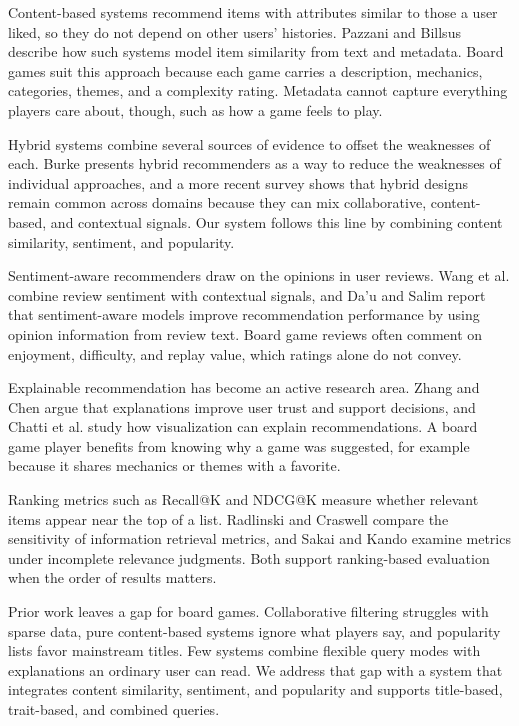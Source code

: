 \documentclass[conference]{IEEEtran}
\begin{document}
Content-based systems recommend items with attributes similar to those a user liked, so they do not depend on other users' histories. Pazzani and Billsus \cite{pazzani2007content} describe how such systems model item similarity from text and metadata. Board games suit this approach because each game carries a description, mechanics, categories, themes, and a complexity rating. Metadata cannot capture everything players care about, though, such as how a game feels to play.

Hybrid systems combine several sources of evidence to offset the weaknesses of each. Burke \cite{burke2002hybrid} presents hybrid recommenders as a way to reduce the weaknesses of individual approaches, and a more recent survey \cite{ko2022survey} shows that hybrid designs remain common across domains because they can mix collaborative, content-based, and contextual signals. Our system follows this line by combining content similarity, sentiment, and popularity.

Sentiment-aware recommenders draw on the opinions in user reviews. Wang et al. \cite{wang2017location} combine review sentiment with contextual signals, and Da'u and Salim \cite{da2019sentiment} report that sentiment-aware models improve recommendation performance by using opinion information from review text. Board game reviews often comment on enjoyment, difficulty, and replay value, which ratings alone do not convey.

Explainable recommendation has become an active research area. Zhang and Chen \cite{zhang2020explainable} argue that explanations improve user trust and support decisions, and Chatti et al. \cite{chatti2024visualization} study how visualization can explain recommendations. A board game player benefits from knowing why a game was suggested, for example because it shares mechanics or themes with a favorite.

Ranking metrics such as Recall@K and NDCG@K measure whether relevant items appear near the top of a list. Radlinski and Craswell \cite{radlinski2010comparing} compare the sensitivity of information retrieval metrics, and Sakai and Kando \cite{sakai2008information} examine metrics under incomplete relevance judgments. Both support ranking-based evaluation when the order of results matters.

Prior work leaves a gap for board games. Collaborative filtering struggles with sparse data, pure content-based systems ignore what players say, and popularity lists favor mainstream titles. Few systems combine flexible query modes with explanations an ordinary user can read. We address that gap with a system that integrates content similarity, sentiment, and popularity and supports title-based, trait-based, and combined queries.
\end{document}
